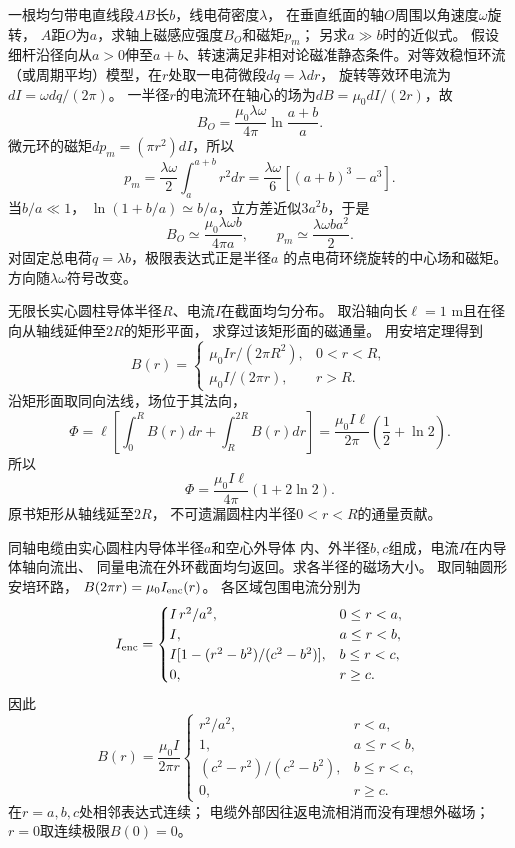 

\problemtext 一根均匀带电直线段$AB$长$b$，线电荷密度$\lambda$，
在垂直纸面的轴$O$周围以角速度$\omega$旋转，
$A$距$O$为$a$，求轴上磁感应强度$B_O$和磁矩$p_m$；
另求$a\gg b$时的近似式。
\workings
假设细杆沿径向从$a>0$伸至$a+b$、转速满足非相对论磁准静态条件。对等效稳恒环流（或周期平均）模型，在$r$处取一电荷微段$dq=\lambda dr$，
旋转等效环电流为$dI=\omega dq/(2\pi)$。
一半径$r$的电流环在轴心的场为$dB=\mu_0dI/(2r)$，故
\[
\boxed{B_O=\frac{\mu_0\lambda\omega}{4\pi}
\ln\frac{a+b}{a}}.
\]
微元环的磁矩$d p_m=(\pi r^2)dI$，所以
\[
\boxed{p_m=\frac{\lambda\omega}{2}\int_a^{a+b}r^2dr
=\frac{\lambda\omega}{6}[(a+b)^3-a^3]}.
\]
当$b/a\ll1$，
$\ln(1+b/a)\simeq b/a$，立方差近似$3a^2b$，于是
\[
\boxed{B_O\simeq\frac{\mu_0\lambda\omega b}{4\pi a},
\qquad p_m\simeq\frac{\lambda\omega ba^2}{2}}.
\]
\crosscheck 对固定总电荷$q=\lambda b$，极限表达式正是半径$a$
的点电荷环绕旋转的中心场和磁矩。方向随$\lambda\omega$符号改变。

\problemtext 无限长实心圆柱导体半径$R$、电流$I$在截面均匀分布。
取沿轴向长$\ell=1$ m且在径向从轴线延伸至$2R$的矩形平面，
求穿过该矩形面的磁通量。
\workings
用安培定理得到
\[
B(r)=
\begin{cases}
\mu_0Ir/(2\pi R^2),&0<r<R,\\
\mu_0I/(2\pi r),&r>R.
\end{cases}
\]
沿矩形面取同向法线，场位于其法向，
\[
\Phi=\ell\left[\int_0^RB(r)dr+\int_R^{2R}B(r)dr\right]
=\frac{\mu_0I\ell}{2\pi}
\left(\frac12+\ln2\right).
\]
所以
\[
\boxed{\Phi=\frac{\mu_0I\ell}{4\pi}(1+2\ln2)}.
\]
\crosscheck 原书矩形从轴线延至$2R$，
不可遗漏圆柱内半径$0<r<R$的通量贡献。

\problemtext 同轴电缆由实心圆柱内导体半径$a$和空心外导体
内、外半径$b,c$组成，电流$I$在内导体轴向流出、
同量电流在外环截面均匀返回。求各半径的磁场大小。
\workings
取同轴圆形安培环路，
$B(2\pi r)=\mu_0I_{\rm enc}(r)$。
各区域包围电流分别为
\[
I_{\rm enc}=
\begin{cases}
I\,r^2/a^2,&0\le r<a,\\
I,&a\le r<b,\\
I[1-(r^2-b^2)/(c^2-b^2)],&b\le r<c,\\
0,&r\ge c.
\end{cases}
\]
因此
\[
\boxed{B(r)=\frac{\mu_0 I}{2\pi r}
\begin{cases}
r^2/a^2,&r<a,\\
1,&a\le r<b,\\
(c^2-r^2)/(c^2-b^2),&b\le r<c,\\
0,&r\ge c.
\end{cases}}
\]
\crosscheck 在$r=a,b,c$处相邻表达式连续；
电缆外部因往返电流相消而没有理想外磁场；$r=0$取连续极限$B(0)=0$。

